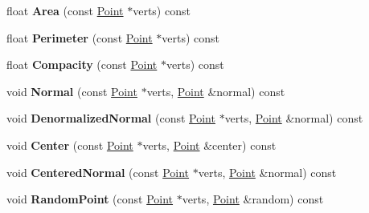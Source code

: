 \begin{DoxyCompactItemize}
\item 
float {\bfseries Area} (const \hyperlink{classPoint}{Point} $\ast$verts) const \hypertarget{classIndexedTriangle_a726d46253ceaef9e3724d195374c1050}{}\label{classIndexedTriangle_a726d46253ceaef9e3724d195374c1050}

\item 
float {\bfseries Perimeter} (const \hyperlink{classPoint}{Point} $\ast$verts) const \hypertarget{classIndexedTriangle_ab089bb99995ef572f42401d65868104f}{}\label{classIndexedTriangle_ab089bb99995ef572f42401d65868104f}

\item 
float {\bfseries Compacity} (const \hyperlink{classPoint}{Point} $\ast$verts) const \hypertarget{classIndexedTriangle_aa6fc9a36d7d895f5b23de439d7474e94}{}\label{classIndexedTriangle_aa6fc9a36d7d895f5b23de439d7474e94}

\item 
void {\bfseries Normal} (const \hyperlink{classPoint}{Point} $\ast$verts, \hyperlink{classPoint}{Point} \&normal) const \hypertarget{classIndexedTriangle_aec07600ca093248c4e49d02b3f2f7a36}{}\label{classIndexedTriangle_aec07600ca093248c4e49d02b3f2f7a36}

\item 
void {\bfseries Denormalized\+Normal} (const \hyperlink{classPoint}{Point} $\ast$verts, \hyperlink{classPoint}{Point} \&normal) const \hypertarget{classIndexedTriangle_a6077f4cb876cdbbef181d4501d5b28f7}{}\label{classIndexedTriangle_a6077f4cb876cdbbef181d4501d5b28f7}

\item 
void {\bfseries Center} (const \hyperlink{classPoint}{Point} $\ast$verts, \hyperlink{classPoint}{Point} \&center) const \hypertarget{classIndexedTriangle_a773a19dac0e1b35913f94b8ec08f638d}{}\label{classIndexedTriangle_a773a19dac0e1b35913f94b8ec08f638d}

\item 
void {\bfseries Centered\+Normal} (const \hyperlink{classPoint}{Point} $\ast$verts, \hyperlink{classPoint}{Point} \&normal) const \hypertarget{classIndexedTriangle_a307ff86b3dcb63701e4805ced9a21730}{}\label{classIndexedTriangle_a307ff86b3dcb63701e4805ced9a21730}

\item 
void {\bfseries Random\+Point} (const \hyperlink{classPoint}{Point} $\ast$verts, \hyperlink{classPoint}{Point} \&random) const \hypertarget{classIndexedTriangle_ad2fc2080a0d1ead335836991822eeca2}{}\label{classIndexedTriangle_ad2fc2080a0d1ead335836991822eeca2}


\end{DoxyCompactItemize}
